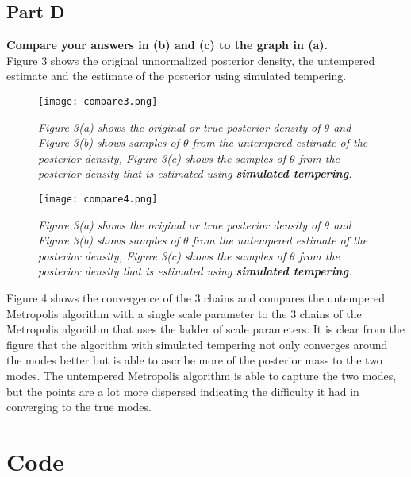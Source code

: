 \documentclass{article}
\begin{document}
\subsection{Part D}
\textbf{Compare your answers in (b) and (c) to the graph in (a). }\\
Figure 3 shows the original unnormalized posterior density, the untempered estimate and the estimate of the posterior using simulated tempering.
 \begin{figure}[H]
\centering
\texttt{[image: compare3.png]}
\caption{\textit{Figure 3(a) shows the original or true posterior density of $\theta$ and Figure 3(b) shows samples of $\theta$ from the untempered estimate of the posterior density, Figure 3(c) shows the samples of $\theta$ from the posterior density that is estimated using \textbf{simulated tempering}.}}
\label{deltat}
\end{figure}

 \begin{figure}[H]
\centering
\texttt{[image: compare4.png]}
\caption{\textit{Figure 3(a) shows the original or true posterior density of $\theta$ and Figure 3(b) shows samples of $\theta$ from the untempered estimate of the posterior density, Figure 3(c) shows the samples of $\theta$ from the posterior density that is estimated using \textbf{simulated tempering}.}}
\label{deltat}
\end{figure}
Figure 4 shows the convergence of the 3 chains and compares the untempered Metropolis algorithm with a single scale parameter to the 3 chains of the Metropolis algorithm that uses the ladder of scale parameters. It is clear from the figure that the algorithm with simulated tempering not only converges around the modes better but is able to ascribe more of the posterior mass to the two modes. The untempered Metropolis algorithm is able to capture the two modes, but the points are a lot more dispersed indicating the difficulty it had in converging to the true modes.

\section{Code}
\end{document}
